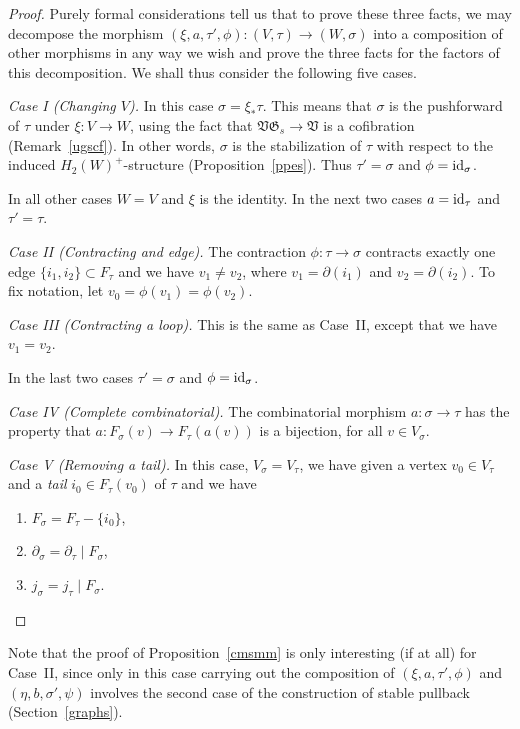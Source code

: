 \documentclass[11pt]{amsart}
\theoremstyle{definition}
\theoremstyle{remark}
\newenvironment{pf}{\begin{proof}}{\end{proof}}
\newcommand{\lst}{_{\ast}}
\newcommand{\GG}{{\mathfrak{G}}}
\newcommand{\VV}{{\mathfrak{V}}}
\newcommand{\del}{\partial}
\newcommand{\resto}{{ \mid }}
\newcommand{\id}{\operatorname{\rm id}}
\renewcommand{\t}{_{\tau}}
\newcommand{\s}{_{\sigma}}
\theoremstyle{plain}
\theoremstyle{definition}
\theoremstyle{remark}
\begin{document}
\begin{pf}
Purely formal considerations tell us that to prove these three facts, we may
decompose the morphism
\((\xi,a,\tau',\phi):(V,\tau)\rightarrow(W,\sigma)\) into a composition of other
morphisms in any way we wish and prove the
three facts for the factors of this decomposition. We shall thus consider the
following five cases.

{\em Case I (Changing \(V\)). } In this case \(\sigma=\xi\lst\tau\). This means
that \(\sigma\) is the pushforward of \(\tau\)
under \(\xi:V\rightarrow W\), using the fact that \(\VV\GG_s\rightarrow\VV\) is a
cofibration (Remark~\ref{ugscf}). In other
words, \(\sigma\) is the stabilization of \(\tau\) with respect to the induced
\(H_2(W)^+\)-structure (Proposition~\ref{ppes}).
Thus \(\tau'=\sigma\) and \(\phi=\id\s\).

In all other cases \(W=V\) and \(\xi\) is the identity. In the next two cases
\(a=\id\t\) and \(\tau'=\tau\).

{\em Case II (Contracting and edge). } The contraction
\(\phi:\tau\rightarrow\sigma\) contracts exactly one edge
\(\{i_1,i_2\}\subset F\t\) and we have \(v_1\not=v_2\), where \(v_1=\del(i_1)\) and
\(v_2=\del(i_2)\). To fix notation, let
\(v_0=\phi(v_1)=\phi(v_2)\).

{\em Case III (Contracting a loop). } This is the same as Case~II, except that
we have \(v_1=v_2\).

In the last two cases \(\tau'=\sigma\) and \(\phi=\id\s\).

{\em Case IV (Complete combinatorial). } The combinatorial morphism
\(a:\sigma\rightarrow\tau\) has the property that
\(a:F\s(v)\rightarrow F\t(a(v))\) is a bijection, for all \(v\in V\s\).

{\em Case V (Removing a tail). } In this case, \(V\s=V\t\), we have given a
vertex \(v_0\in V\t\) and a {\em tail }\(i_0\in
F\t(v_0)\) of \(\tau\) and we have
\begin{enumerate}
\item \(F\s= F\t-\{i_0\}\),
\item \(\del\s=\del\t\resto F\s\),
\item \(j\s=j\t\resto F\s\).
\end{enumerate}
\renewcommand{\qed}{}\end{pf}

Note that the proof of Proposition~\ref{cmsmm} is only interesting (if at all)
for Case~II, since only in this case
carrying out the composition of \((\xi,a,\tau',\phi)\) and
\((\eta,b,\sigma',\psi)\) involves the second case of the
construction of stable pullback (Section~\ref{graphs}).
\end{document}
